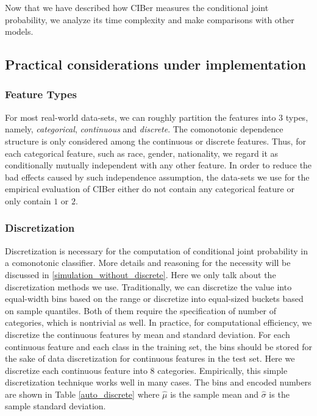 \documentclass[twoside,11pt]{article}
\begin{document}
Now that we have described how CIBer measures the conditional joint probability, we analyze its time complexity and make comparisons with other models.

\subsection{Practical considerations under implementation}\label{refinements}

\subsubsection{Feature Types}\label{feature_type}
For most real-world data-sets, we can roughly partition the features into 3 types, namely, \textit{categorical}, \textit{continuous} and \textit{discrete}. The comonotonic dependence structure is only considered among the continuous or discrete features. Thus, for each categorical feature, such as race, gender, nationality, we regard it as conditionally mutually independent with any other feature. In order to reduce the bad effects caused by such independence assumption, the data-sets we use for the empirical evaluation of CIBer either do not contain any categorical feature or only contain $1$ or $2$. 

\subsubsection{Discretization}\label{discretization}
Discretization is necessary for the computation of conditional joint probability in a comonotonic classifier. More details and reasoning for the necessity will be discussed in \ref{simulation_without_discrete}. Here we only talk about the discretization methods we use. Traditionally, we can discretize the value into equal-width bins based on the range or discretize into equal-sized buckets based on sample quantiles. Both of them require the specification of number of categories, which is nontrivial as well. In practice, for computational efficiency, we discretize the continuous features by mean and standard deviation. For each continuous feature and each class in the training set, the bins should be stored for the sake of data discretization for continuous features in the test set. Here we discretize each continuous feature into $8$ categories. Empirically, this simple discretization technique works well in many cases. The bins and encoded numbers are shown in Table \ref{auto_discrete} where $\hat{\mu}$ is the sample mean and $\hat{\sigma}$ is the sample standard deviation.
\end{document}

